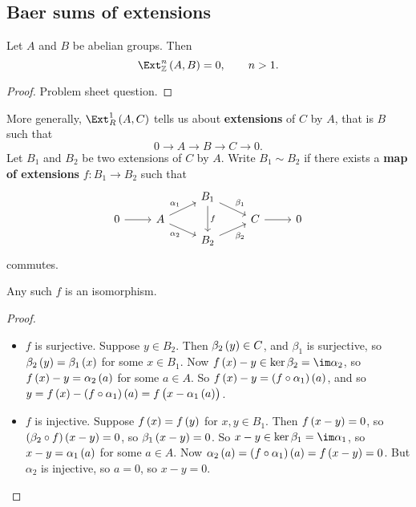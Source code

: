 \subsection{Baer sums of extensions}

\begin{proposition}
Let $ A $ and $ B $ be abelian groups. Then
$$ \Ext_\ZZ^n\br{A, B} = 0, \qquad n > 1. $$
\end{proposition}

\begin{proof}
Problem sheet question.
\end{proof}

More generally, $ \Ext_R^1\br{A, C} $ tells us about \textbf{extensions} of $ C $ by $ A $, that is $ B $ such that
$$ 0 \to A \to B \to C \to 0. $$
Let $ B_1 $ and $ B_2 $ be two extensions of $ C $ by $ A $. Write $ B_1 \sim B_2 $ if there exists a \textbf{map of extensions} $ f : B_1 \to B_2 $ such that
$$
\begin{tikzcd}[row sep=tiny]
& & B_1 \arrow{dr}{\beta_1} \arrow{dd}{f} & & \\
0 \arrow{r} & A \arrow{ur}{\alpha_1} \arrow{dr}[swap]{\alpha_2} & & C \arrow{r} & 0 \\
& & B_2 \arrow{ur}[swap]{\beta_2} & &
\end{tikzcd}
$$
commutes.

\pagebreak

\begin{proposition}
Any such $ f $ is an isomorphism.
\end{proposition}

\begin{proof}
\hfill
\begin{itemize}
\item $ f $ is surjective. Suppose $ y \in B_2 $. Then $ \beta_2\br{y} \in C $, and $ \beta_1 $ is surjective, so $ \beta_2\br{y} = \beta_1\br{x} $ for some $ x \in B_1 $. Now $ f\br{x} - y \in \ker \beta_2 = \im \alpha_2 $, so $ f\br{x} - y = \alpha_2\br{a} $ for some $ a \in A $. So $ f\br{x} - y = \br{f \circ \alpha_1}\br{a} $, and so $ y = f\br{x} - \br{f \circ \alpha_1}\br{a} = f\br{x - \alpha_1\br{a}} $.
\item $ f $ is injective. Suppose $ f\br{x} = f\br{y} $ for $ x, y \in B_1 $. Then $ f\br{x - y} = 0 $, so $ \br{\beta_2 \circ f}\br{x - y} = 0 $, so $ \beta_1\br{x - y} = 0 $. So $ x - y \in \ker \beta_1 = \im \alpha_1 $, so $ x - y = \alpha_1\br{a} $ for some $ a \in A $. Now $ \alpha_2\br{a} = \br{f \circ \alpha_1}\br{a} = f\br{x - y} = 0 $. But $ \alpha_2 $ is injective, so $ a = 0 $, so $ x - y = 0 $.
\end{itemize}
\end{proof}

